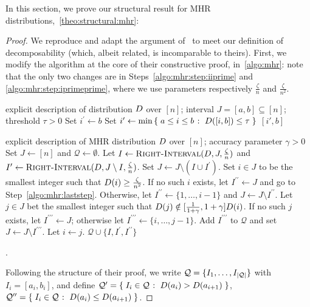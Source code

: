 In this section, we prove our structural result for MHR distributions,~\cref{theo:structural:mhr}:
\theostructuralmhr*
\begin{proof} We reproduce and adapt the argument of~\cite[Section 5.1]{CDSS:13} to meet our definition of decomposability (which, albeit related, is incomparable to theirs). First, we modify the algorithm at the core of their constructive proof, in~\cref{algo:mhr}: note that the only two changes are in Steps~\ref{algo:mhr:step:iiprime} and \ref{algo:mhr:step:iprimeprime}, where we use parameters respectively $\frac{\zeta}{n}$ and $\frac{\zeta}{n^2}$.
\begin{algorithm}
  \begin{algorithmic}[1]
    \Require explicit description of distribution $D$ over $[n]$; interval $J=[a,b]\subseteq[n]$; threshold $\tau > 0$
      \State Set $i^\prime\gets b$
    \Else
      \State Set $i^\prime\gets \min\left\{\; a\leq i\leq b \;\colon\;  D([i,b]) \leq \tau \; \right\}$
    \EndIf
    \State \Return $[i',b]$
  \end{algorithmic}
  \caption{\label{algo:mhr:rightinterval:cdss} $\textsc{Right-Interval}(\D,J,\tau)$}
\end{algorithm}
\begin{algorithm}
  \begin{algorithmic}[1]
    \Require explicit description of MHR distribution $D$ over $[n]$; accuracy parameter $\gamma > 0$
    \State Set $J\gets [n]$ and $\mathcal{Q}\gets \emptyset$.
    \State Let $I\gets\textsc{Right-Interval}(D,J,\frac{\zeta}{n})$ and $I^\prime\gets\textsc{Right-Interval}(D,J\setminus I,\frac{\zeta}{n})$. Set $J\gets J\setminus (I\cup I^\prime)$. \label{algo:mhr:step:iiprime}
    \State Set $i\in J$ to be the smallest integer such that $D(i)\geq \frac{\zeta}{n^2}$. 
            If no such $i$ exists, let $I^{\prime\prime}\gets J$ and go to Step~\ref{algo:mhr:laststep}. 
            Otherwise, let $I^{\prime\prime}\gets \{1,\dots,i-1\}$ and $J\gets J\setminus I^{\prime\prime}$.
            \label{algo:mhr:step:iprimeprime}
    \label{algo:mhr:whileloop}
      \State Let $j\in J$ bet the smallest integer such that $D(j) \notin [\frac{1}{1+\gamma}, 1+\gamma]D(i)$.
            If no such $j$ exists, let $I^{\prime\prime\prime}\gets J$; otherwise let $I^{\prime\prime\prime}\gets \{i,\dots, j-1\}$.
      \State Add $I^{\prime\prime\prime}$ to $\mathcal{Q}$ and set $J\gets J\setminus I^{\prime\prime\prime}$.
      \State Let $i\gets j$.
    \EndWhile
    \State \Return $\mathcal{Q}\cup\{I,I^{\prime},I^{\prime\prime}\}$\label{algo:mhr:laststep}
  \end{algorithmic}
  \caption{\label{algo:mhr} $\textsc{Decompose-MHR}^\prime(\D,\gamma)$}.
\end{algorithm}
Following the structure of their proof, we write $\mathcal{Q}=\{I_1,\dots,I_{\left\lvert \mathcal{Q} \right\rvert}\}$ with $I_i=[a_i,b_i]$, and define $\mathcal{Q}^\prime=\left\{\;  I_i\in \mathcal{Q}  \;\colon\;  D(a_i) > D(a_{i+1})\; \right\}$, $\mathcal{Q}^{\prime\prime}=\left\{\;  I_i\in \mathcal{Q}  \;\colon\;  D(a_i) \leq D(a_{i+1})\; \right\}$.


\end{proof}
